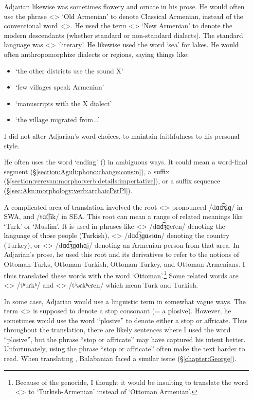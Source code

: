 \documentclass[output=paper]{langscibook}
\begin{document}
Adjarian likewise was  sometimes flowery and ornate in his prose. He would often use the phrase <> `Old Armenian' to denote Classical Armenian, instead of the conventional word <>. He used the term <> `New Armenian' to denote the modern descendants (whether standard or non-standard dialects). The standard language was <> `literary'. He likewise used the word `sea' for lakes.  He would often anthropomorphize dialects or regions, saying things like:
\begin{itemize}
    \item  `the other districts use the sound X' 
    \item `few villages speak Armenian'
    \item `manuscripts with the  X dialect'
    \item `the village migrated from...'
\end{itemize}

I did not alter Adjarian's word choices, to maintain faithfulness to his personal style. 

He   often  uses the word `ending'  () in ambiguous ways. It could mean a word-final segment (\S\ref{section:Aguli:phono:change:cons:n}), a suffix (\S\ref{section:yerevan:morpho:verb:details:impertative}), or a suffix sequence (\S\ref{sec:Akn:morphology:verb:archaicPstPl}). 

A complicated area of translation involved the root <> pronounced /dɑd͡ʒiɡ/ in SWA, and /tɑt͡ʃik/ in SEA. This root can mean a range of related meanings like `Turk' or `Muslim'. It is used in phrases like <> /dɑd͡ʒɡeɾen/ denoting the language of those people (Turkish), <> /dɑd͡ʒɡɑstɑn/ denoting   the country (Turkey), or <> /dɑd͡ʒɡɑhɑj/ denoting an Armenian person from that area. In Adjarian's prose, he used this root and its derivatives to refer to the notions of  Ottoman Turks, Ottoman Turkish, Ottoman Turkey, and Ottoman Armenians. I thus translated these words  with the word `Ottoman'.\footnote{Because of the genocide, I thought it would be insulting to translate the word  <> to `Turkish-Armenian' instead of `Ottoman Armenian'.} Some related words are <> /tʰuɾkʰ/ and <> /tʰəɾkʰeɾen/ which mean Turk and Turkish. 

In some case, Adjarian would use a linguistic term in somewhat vague ways. The term <> is supposed to denote a stop consonant (= a plosive). However, he sometimes would use the word ``plosive'' to denote either a stop or affricate. Thus throughout the translation, there are likely sentences where I used the word ``plosive'', but the phrase ``stop  or affricate'' may have captured his intent better. Unfortunately, using the phrase ``stop  or affricate''  often make the text harder to read.  When translating \citet{Adjarian-1899-ArmenianExplosives}, Balabanian faced a similar issue (\S\ref{chapter:George}).
\end{document}
